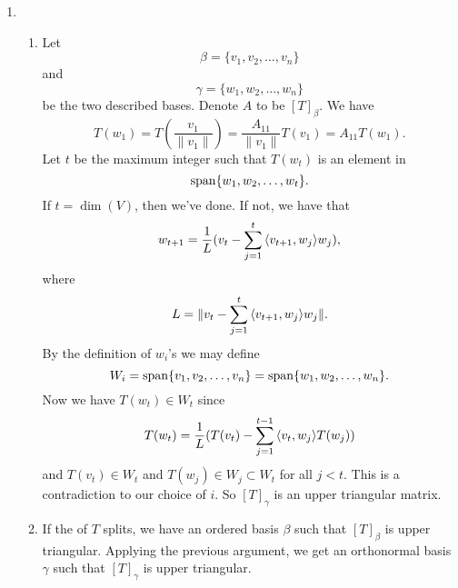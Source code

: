 \begin{enumerate}
\item \begin{enumerate}
\item Let 
\[\beta =\{v_1,v_2,\ldots ,v_n\}\]
and 
\[\gamma=\{w_1,w_2,\ldots ,w_n\}\]
be the two described bases. Denote $A$ to be $[T]_{\beta}$. We have 
\[T(w_1)=T(\frac{v_1}{\|v_1\|})=\frac{A_{11}}{\|v_1\|}T(v_1)=A_{11}T(w_1).\]
Let $t$ be the maximum integer such that $T(w_{t})$ is an element in 
\[\sp\{w_1,w_2,\ldots ,w_{t}\}.\]
If $t=\dim (V)$, then we've done. If not, we have that 
\[w_{t+1}=\frac{1}{L}(v_t-\sum_{j=1}^{t}{\lag v_{t+1},w_j\rag w_j}),\]
where 
\[L=\|v_t-\sum_{j=1}^{t}{\lag v_{t+1},w_j\rag w_j}\|.\]
By the definition of $w_i$'s we may define 
\[W_i=\sp\{v_1,v_2,\ldots ,v_n\}=\sp\{w_1,w_2,\ldots,w_n\}.\]
Now we have $T(w_t)\in W_t$ since 
\[T(w_t)=\frac{1}{L}(T(v_t)-\sum_{j=1}^{t-1}{\lag v_t,w_j\rag T(w_j)})\]
and $T(v_t)\in W_t$ and $T(w_j)\in W_j\subset W_t$ for all $j<t$. This is a contradiction to our choice of $i$. So $[T]_{\gamma}$ is an upper triangular matrix.
\item If the \charpoly{} of $T$ splits, we have an ordered basis $\beta $ such that $[T]_{\beta }$ is upper triangular. Applying the previous argument, we get an orthonormal basis $\gamma $ such that $[T]_{\gamma}$ is upper triangular.
\end{enumerate}
\end{enumerate}

